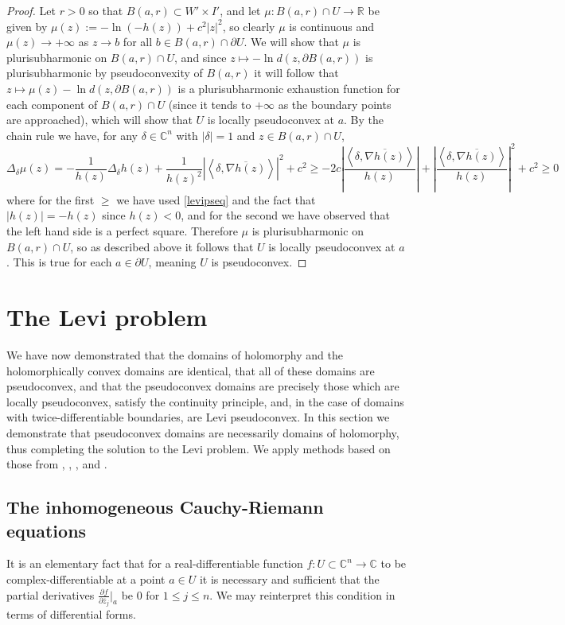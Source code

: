 \documentclass[11pt,a4paper, final, twoside]{article}
\numberwithin{equation}{section}
\newcommand{\C}{\mathbb C}
\newcommand{\R}{\mathbb R}
\newcommand{\con}[1]{\overline{#1}}
\newcommand{\pd}[2]{\frac{\partial #1}{\partial #2}}
\newcommand{\bd}{\partial}
\newcommand{\ball}{B}
\newcommand{\emetric}{d}
\renewcommand{\sp}[2]{\left<#1,#2\right>}
\newcommand{\sprod}[2]{\sp{#1}{#2}}
\newcommand{\cgrad}[1]{\nabla #1}
\begin{document}
\begin{proof}
Let $r>0$ so that $\ball(a,r)\subset W'\times I'$, and
let $\mu\colon\ball(a,r)\cap U\to\R$
be given by $\mu(z):=-\ln(-h(z))+c^2|z|^2$, so clearly $\mu$ is continuous and $\mu(z)\to+\infty$ as $z\to b$ for all $b\in \ball(a,r)\cap \bd U$. We will show that $\mu$ is plurisubharmonic on 
$\ball(a,r)\cap U$, and
since $z\mapsto -\ln\emetric(z,\bd\ball(a,r))$ is plurisubharmonic by pseudoconvexity of $\ball(a,r)$ it will follow that $z\mapsto \mu(z)-\ln\emetric(z,\bd\ball(a,r))$ is a plurisubharmonic
exhaustion function for each component of 
$\ball(a,r)\cap U$ (since it tends to $+\infty$ as the boundary points are approached), which will show that $U$ is locally pseudoconvex at $a$. By the chain rule we have, for any $\delta\in\C^n$
with $|\delta|=1$ and $z\in\ball(a,r)\cap U$,
$$
 \Delta_\delta \mu(z)
	=-\frac{1}{h(z)}\Delta_\delta h(z)+\frac{1}{h(z)^2}\left|\sprod{\delta}{\con{\cgrad{h}(z)}}\right|^2+c^2 \nonumber 
	\geq -2c\left|\frac{\sprod{\delta}{\con{\cgrad{h}(z)}}}{h(z)}\right|+\left|\frac{\sprod{\delta}{\con{\cgrad{h}(z)}}}{h(z)}\right|^2+c^2 \geq 0
$$
where for the first $\geq $ we have used \eqref{levipseq} and the fact that $|h(z)|=-h(z)$ since $h(z)<0$, and for the second we have observed that the left hand side is a perfect square.
Therefore $\mu$ is plurisubharmonic on $\ball(a,r)\cap U$, so as described above it follows that $U$ is locally pseudoconvex at $a$. This is true for each $a\in\bd U$, meaning $U$ is pseudoconvex.
\end{proof}





\section{The Levi problem}
\label{chap:levi}
We have now demonstrated that the domains of holomorphy and the holomorphically convex domains are identical, that all of these domains are pseudoconvex, and that the pseudoconvex domains
are precisely those which are locally pseudoconvex, satisfy the continuity principle, and, in the case of domains with twice-differentiable boundaries, are Levi pseudoconvex.
In this section we demonstrate that pseudoconvex domains are necessarily domains of holomorphy, thus completing the solution to the Levi problem. We apply methods based on those from
\cite{bers}, \cite{boas}, \cite{krantz}, \cite{range}
and \cite{itca}.
\subsection{The inhomogeneous Cauchy-Riemann equations}
It is an elementary fact that for a real-differentiable function $f\colon U\subset\C^n\to\C$ to be complex-differentiable at a point $a\in U$ it is necessary and sufficient that the 
partial derivatives $\pd{f}{\con z_j}\big|_a$ be $0$ for $1\leq j\leq n$.
We may reinterpret this condition in terms of differential forms.
\end{document}
